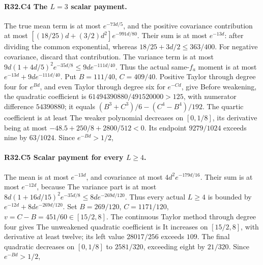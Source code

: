 \paragraph{R32.C4 The \(L=3\) scalar payment.}
The true mean term is at most \(e^{-73d/5}\), and the positive covariance
contribution at most \([(18/25)d+(3/2)d^2]e^{-991d/80}\).
Their sum is at most \(e^{-13d}\): after dividing the common exponential,
whereas \(18/25+3d/2\le363/400\). For negative covariance, discard that contribution.
The variance term is at most
\(9d(1+4d/5)^2e^{-35d/8}\le9de^{-111d/40}\). Thus the actual
same-\(f_a\) moment is at most \(e^{-13d}+9de^{-111d/40}\).
Put \(B=111/40\), \(C=409/40\). Positive Taylor through degree four
for \(e^{Bd}\), and even Taylor through degree six for \(e^{-Cd}\), give
Before weakening, the quadratic coefficient is
\(61494390880/491520000>125\), with numerator difference \(54390880\);
it equals \((B^3+C^3)/6-(C^4-B^4)/192\). The quartic coefficient is at least
The weaker polynomial decreases on \([0,\allowbreak 1/8]\), its derivative being at
most \(-48.5+250/8+2800/512<0\). Its endpoint \(9279/1024\) exceeds
nine by \(63/1024\). Since \(e^{-Bd}>1/2\),

\paragraph{R32.C5 Scalar payment for every \(L\ge4\).}
The mean is at most \(e^{-13d}\), and covariance at most
\(4d^2e^{-179d/16}\). Their sum is at most \(e^{-12d}\), because
The variance part is at most
\(8d(1+16d/15)^2e^{-35d/8}\le8de^{-269d/120}\).
Thus every actual \(L\ge4\) is bounded by \(e^{-12d}+8de^{-269d/120}\).
Set \(B=269/120\), \(C=1171/120\), \(v=C-B=451/60\in[15/2,\allowbreak 8]\).
The continuous Taylor method through degree four gives
The unweakened quadratic coefficient is
It increases on \([15/2,\allowbreak 8]\), with derivative at least twelve; its left
value \(28017/256\) exceeds \(109\). The final quadratic decreases on
\([0,\allowbreak 1/8]\) to \(2581/320\), exceeding eight by \(21/320\).
Since \(e^{-Bd}>1/2\),

